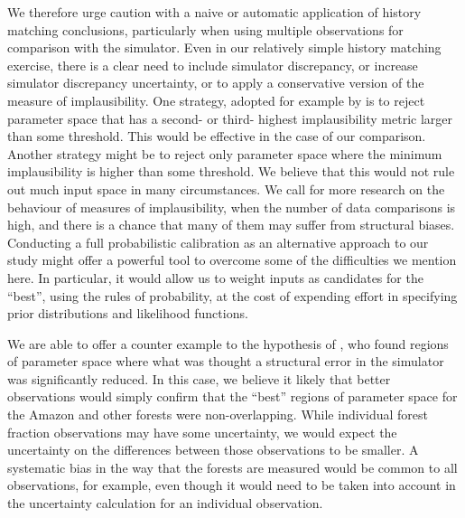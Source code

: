 \documentclass[esd, manuscript]{copernicus}
\begin{document}
We therefore urge caution with a naive or automatic application of history matching conclusions, particularly when using multiple observations for comparison with the simulator. Even in our relatively simple history matching exercise, there is a clear need to include simulator discrepancy, or increase simulator discrepancy uncertainty, or to apply a conservative version of the measure of implausibility. One strategy, adopted for example by \cite{vernon2014observable} is to reject parameter space that has a second- or third- highest implausibility metric larger than some threshold. This would be effective in the case of our comparison. Another strategy might be to reject only parameter space where the minimum implausibility is higher than some threshold. We believe that this would not rule out much input space in many circumstances. We call for more research on the behaviour of measures of implausibility, when the number of data comparisons is high, and there is a chance that many of them may suffer from structural biases. Conducting a full probabilistic calibration as an alternative approach to our study might offer a powerful tool to overcome some of the difficulties we mention here. In particular, it would allow us to weight inputs as candidates for the ``best'', using the rules of probability, at the cost of expending effort in specifying prior distributions and likelihood functions. 

We are able to offer a counter example to the hypothesis of \cite{williamson2014identifying}, who found regions of parameter space where what was thought a structural error in the simulator was significantly reduced. In this case, we believe it likely that better observations would simply confirm that the ``best'' regions of parameter space for the Amazon and other forests were non-overlapping. While individual forest fraction observations may have some uncertainty, we would expect the uncertainty on the differences between those observations to be smaller. A systematic bias in the way that the forests are measured would be common to all observations, for example, even though it would need to be taken into account in the uncertainty calculation for an individual observation.
\end{document}
